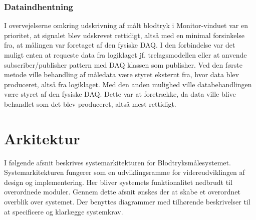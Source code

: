 \subsubsection{Dataindhentning}
I overvejelserne omkring udskrivning af målt blodtryk i Monitor-vinduet var en prioritet, at signalet blev udskrevet rettidigt, altså med en minimal forsinkelse fra, at målingen var foretaget af den fysiske DAQ. I den forbindelse var det muligt enten at requeste data fra logiklaget jf. trelagsmodellen eller at anvende subscriber/publisher pattern med DAQ klassen som publisher. Ved den første metode ville behandling af måledata være styret eksternt fra, hvor data blev produceret, altså fra logiklaget. Med den anden mulighed ville databehandlingen være styret af den fysiske DAQ. Dette var at foretrække, da data ville blive behandlet som det blev produceret, altså mest rettidigt.


\section{Arkitektur}
I følgende afsnit beskrives systemarkitekturen for Blodtryksmålesystemet. Systemarkitekturen fungerer som en udviklingsramme for videreudviklingen af design og implementering. Her bliver systemets funktionalitet nedbrudt til overordnede moduler. Gennem dette afsnit ønskes der at skabe et overordnet overblik over systemet. Der benyttes diagrammer med tilhørende beskrivelser til at specificere og klarlægge systemkrav.

